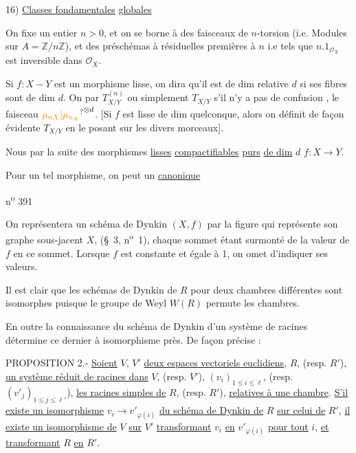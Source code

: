 16) \uline{Classes fondamentales} \uline{globales}

On fixe un entier $n>0$, et on se  borne à des faisceaux de $n$-torsion (i.e. Modules sur $A=\mathbb Z/n\mathbb Z$), et des préschémas à  résiduelles premières à $n$ i.e tels que $n.1_{\mathcal O_X}$ est inversible dans $\mathcal O_X$.

Si $f:X\mathrel{-}Y$ est un morphisme lisse, on dira qu'il est  de dim relative $d$ si ses fibres sont  de dim $d$. On  par $T^{(n)}_{X/Y}$ ou simplement $T_{X/Y}$ s'il n'y a pas de confusion , le faisceau $\unsure{\mu_{nX}|\mu_{n_X}}^{\otimes d}$. [Si $f$ est lisse de dim  quelconque, alors on définit de façon évidente $T_{X/Y}$ en le posant sur les divers morceaux].

Nous  par la suite des morphismes \uline{lisses} \uline{compactifiables} \uline{purs} \uline{de dim} $d$ \qquad $f:X\longrightarrow Y$.

Pour un tel morphisme, on peut  un \uline{ canonique}

\hfill n\textsuperscript{o} 391

On représentera un schéma de Dynkin $(X,f)$ par la figure qui représente son graphe sous-jacent $X$, (\S~3, n\textsuperscript{o}~1), chaque sommet étant surmonté de la valeur de $f$ en ce sommet. Lorsque $f$ est constante et égale à 1, on omet d'indiquer ses valeurs.

Il est clair que les schémas de Dynkin de $R$ pour deux chambres différentes sont isomorphes puisque le groupe de Weyl $W(R)$ permute les chambres.

En outre la connaissance du schéma de Dynkin d'un système de racines détermine ce dernier à isomorphisme près. De façon précise :

PROPOSITION 2.- \uline{Soient} $V$, $V'$ \uline{deux espaces vectoriels euclidiens}, $R$, (resp. $R'$), \uline{un système réduit de racines dans} $V$, (resp. $V'$), $(v_i)_{1\leq i\leq\ell}$, (resp. $(v'_j)_{1\leq j\leq\ell'}$), \uline{les racines simples de} $R$, (resp. $R'$), \uline{relatives à une chambre}. \uline{S'il existe un isomorphisme} $v_i\longrightarrow v'_{\varphi(i)}$ \uline{du schéma de Dynkin de} $R$ \uline{sur celui de} $R'$, \uline{il existe un isomorphisme de} $V$ \uline{sur} $V'$ \uline{transformant} $v_i$ \uline{en} $v'_{\varphi(i)}$ \uline{pour tout} $i$, \uline{et transformant} $R$ \uline{en} $R'$.

